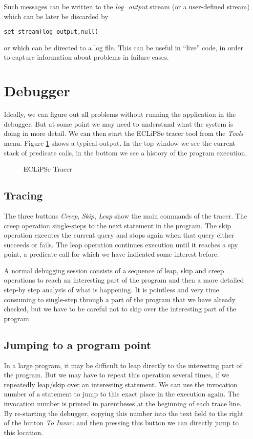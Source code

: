 \documentclass[a4paper,12pt]{report}
\begin{document}
Such messages can be written to the {\it log\_output} stream (or a user-defined stream) which can be later be discarded by
\begin{verbatim}
set_stream(log_output,null)
\end{verbatim}
or which can be directed to a log file. This can be useful in ``live'' code, in order to capture information about problems in failure cases.
\section{Debugger}
Ideally, we can figure out all problems without running the application in the debugger. But at some point we may need to understand what the system is doing in more detail. We can then start the ECLiPSe tracer tool from the {\it Tools} menu. Figure \ref{Tracer} shows a typical output. In the top window we see the current stack of predicate calls, in the bottom we see a history of the program execution. 
\begin{figure}[thbp]
\caption{\label{Tracer}ECLiPSe Tracer}
\end{figure}

\subsection{Tracing}
The three buttons {\it Creep}, {\it Skip}, {\it Leap} show the main commands of the tracer. The creep operation single-steps to the next statement in the program. The skip operation executes the current query and stops again when that query either succeeds or fails. The leap operation continues execution until it reaches a spy point, a predicate call for which we have indicated some interest before.

A normal debugging session consists of a sequence of leap, skip and creep operations to reach an interesting part of the program and then a more detailed step-by step analysis of what is happening. It is pointless and very time consuming to single-step through a part of the program that we have already checked, but we have to be careful not to skip over the interesting part of the program.

\subsection{Jumping to a program point}
In a large program, it may be difficult to leap directly to the interesting part of the program. But we may have to repeat this operation several times, if we repeatedly leap/skip over an interesting statement. We can use the invocation number of a statement to jump to this exact place in the execution again. The invocation number is printed in parentheses at the beginning of each trace line. By re-starting the debugger, copying this number into the text field to the right of the button {\it To Invoc:} and then pressing this button we can directly jump to this location.
\end{document}
